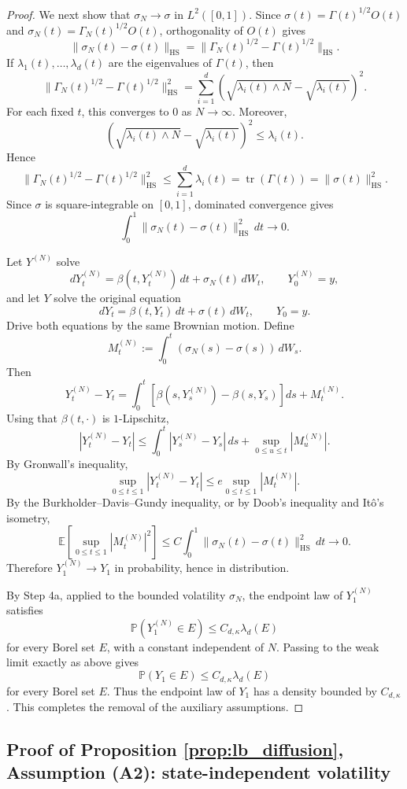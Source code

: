 \documentclass{article}
\newcommand{\1}{\mathbbm{1}}
\numberwithin{equation}{section}
\def\to{\rightarrow}
\begin{document}
\begin{proof}
\medskip

We next show that $\sigma_N\to\sigma$ in $L^2([0,1])$. Since
$\sigma(t)=\Gamma(t)^{1/2}O(t)$ and $\sigma_N(t)=\Gamma_N(t)^{1/2}O(t)$,
orthogonality of $O(t)$ gives
$$
\|\sigma_N(t)-\sigma(t)\|_{\mathrm{HS}}
=
\|\Gamma_N(t)^{1/2}-\Gamma(t)^{1/2}\|_{\mathrm{HS}}.
$$
If $\lambda_1(t),\ldots,\lambda_d(t)$ are the eigenvalues of $\Gamma(t)$, then
$$
\|\Gamma_N(t)^{1/2}-\Gamma(t)^{1/2}\|_{\mathrm{HS}}^2
=
\sum_{i=1}^d
\left(\sqrt{\lambda_i(t)\wedge N}-\sqrt{\lambda_i(t)}\right)^2.
$$
For each fixed $t$, this converges to $0$ as $N\to\infty$. Moreover,
$$
\left(\sqrt{\lambda_i(t)\wedge N}-\sqrt{\lambda_i(t)}\right)^2
\le
\lambda_i(t).
$$
Hence
$$
\|\Gamma_N(t)^{1/2}-\Gamma(t)^{1/2}\|_{\mathrm{HS}}^2
\le
\sum_{i=1}^d\lambda_i(t)
=
\operatorname{tr}(\Gamma(t))
=
\|\sigma(t)\|_{\mathrm{HS}}^2.
$$
Since $\sigma$ is square-integrable on $[0,1]$, dominated convergence gives
$$
\int_0^1
\|\sigma_N(t)-\sigma(t)\|_{\mathrm{HS}}^2\,dt
\to0.
$$

Let $Y^{(N)}$ solve
$$
dY_t^{(N)}
=
\beta(t,Y_t^{(N)})\,dt+\sigma_N(t)\,dW_t,
\qquad
Y_0^{(N)}=y,
$$
and let $Y$ solve the original equation
$$
dY_t
=
\beta(t,Y_t)\,dt+\sigma(t)\,dW_t,
\qquad
Y_0=y.
$$
Drive both equations by the same Brownian motion. Define
$$
M_t^{(N)}
:=
\int_0^t(\sigma_N(s)-\sigma(s))\,dW_s.
$$
Then
$$
Y_t^{(N)}-Y_t
=
\int_0^t
\left[
\beta(s,Y_s^{(N)})-\beta(s,Y_s)
\right]ds
+
M_t^{(N)}.
$$
Using that $\beta(t,\cdot)$ is $1$-Lipschitz,
$$
|Y_t^{(N)}-Y_t|
\le
\int_0^t |Y_s^{(N)}-Y_s|\,ds
+
\sup_{0\le u\le t}|M_u^{(N)}|.
$$
By Gronwall's inequality,
$$
\sup_{0\le t\le1}|Y_t^{(N)}-Y_t|
\le
e\sup_{0\le t\le1}|M_t^{(N)}|.
$$
By the Burkholder--Davis--Gundy inequality, or by Doob's inequality and
Itô's isometry,
$$
\mathbb E\left[\sup_{0\le t\le1}|M_t^{(N)}|^2\right]
\le
C
\int_0^1
\|\sigma_N(t)-\sigma(t)\|_{\mathrm{HS}}^2\,dt
\to0.
$$
Therefore
$
Y_1^{(N)}\to Y_1
$ in probability, hence in distribution.

By Step 4a, applied to the bounded volatility $\sigma_N$, the endpoint law of
$Y_1^{(N)}$ satisfies
$$
\mathbb P(Y_1^{(N)}\in E)
\le
C_{d,\kappa}\lambda_d(E)
$$
for every Borel set $E$, with a constant independent of $N$. Passing to the
weak limit exactly as above gives
$$
\mathbb P(Y_1\in E)
\le
C_{d,\kappa}\lambda_d(E)
$$
for every Borel set $E$. Thus the endpoint law of $Y_1$ has a density bounded by $C_{d,\kappa}$.
This completes the removal of the auxiliary assumptions.
\end{proof}

\subsection{Proof of Proposition \ref{prop:lb_diffusion}, Assumption (A2): state-independent volatility}\label{sec:proof_prop_34_first}
\end{document}
